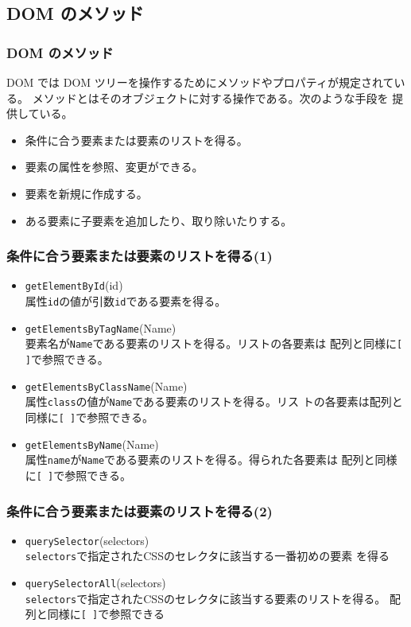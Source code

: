 \documentclass[dvipsk]{beamer}
\begin{document}
\subsection{DOM のメソッド}
\begin{frame}[containsverbatim]
 \frametitle{DOM のメソッド}
DOM では DOM ツリーを操作するためにメソッドやプロパティが規定されている。
 メソッドとはそのオブジェクトに対する操作である。次のような手段を
       提供している。
\begin{itemize}
 \item 条件に合う要素または要素のリストを得る。
 \item 要素の属性を参照、変更ができる。
 \item 要素を新規に作成する。
 \item ある要素に子要素を追加したり、取り除いたりする。
\end{itemize}
\end{frame}
\newcommand{\DOMM}{\texttt}
\begin{frame}[containsverbatim]
 \frametitle{条件に合う要素または要素のリストを得る(1)}
\begin{itemize}
 \item \DOMM{getElementById}{(id)}\\
      属性\texttt{id}の値が引数\texttt{id}である要素を得る。
 \item \DOMM{getElementsByTagName}{(Name)}\\
     要素名が\texttt{Name}である要素のリストを得る。リストの各要素は
	  配列と同様に\texttt{[ ]}で参照できる。
 \item \DOMM{getElementsByClassName}{(Name)}\\
     属性\texttt{class}の値が\texttt{Name}である要素のリストを得る。リス
	  トの各要素は配列と同様に\texttt{[ ]}で参照できる。
 \item \DOMM{getElementsByName}{(Name)}\\
     属性\texttt{name}が\texttt{Name}である要素のリストを得る。得られた各要素は
	  配列と同様に\texttt{[ ]}で参照できる。
\end{itemize}
\end{frame}
\begin{frame}[containsverbatim]
 \frametitle{条件に合う要素または要素のリストを得る(2)}
\begin{itemize}
 \item \DOMM{querySelector}{(selectors)}\\
     \texttt{selectors}で指定されたCSSのセレクタに該当する一番初めの要素
	  を得る
 \item \DOMM{querySelectorAll}{(selectors)}\\
     \texttt{selectors}で指定されたCSSのセレクタに該当する要素のリストを得る。
	  配列と同様に\texttt{[ ]}で参照できる
\end{itemize}
\end{frame}
\end{document}
